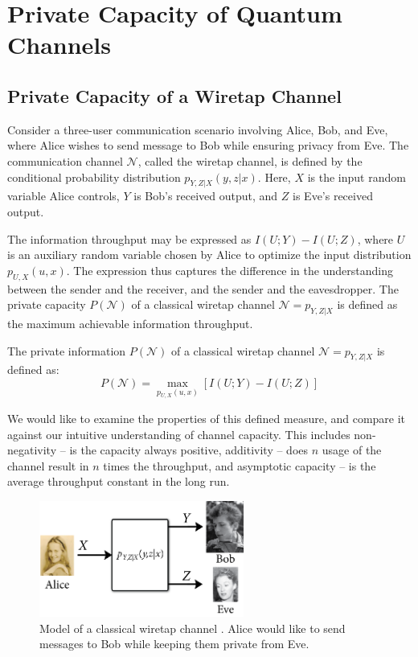 \section{Private Capacity of Quantum Channels}

\subsection{Private Capacity of a Wiretap Channel}

Consider a three-user communication scenario involving Alice, Bob, and Eve, where Alice wishes to send message to Bob while ensuring privacy from Eve. The communication channel $\mathcal{N}$, called the wiretap channel, is defined by the conditional probability distribution $p_{Y,Z|X}(y, z|x)$. Here, $X$ is the input random variable Alice controls, $Y$ is Bob's received output, and $Z$ is Eve's received output.

The information throughput may be expressed as $I(U; Y) - I(U; Z)$, where $U$ is an auxiliary random variable chosen by Alice to optimize the input distribution $p_{U,X}(u, x)$. The expression thus captures the difference in the understanding between the sender and the receiver, and the sender and the eavesdropper. The private capacity $P(\mathcal{N})$ of a classical wiretap channel $\mathcal{N} = p_{Y,Z|X}$ is defined as the maximum achievable information throughput.

\begin{definition}
The private information $P(\mathcal{N})$ of a classical wiretap channel $\mathcal{N} = p_{Y,Z|X}$ is defined as:
$$P(\mathcal{N}) = \max_{p_{U,X}(u,x)} \left[ I(U;Y) - I(U;Z) \right]$$
\end{definition}

We would like to examine the properties of this defined measure, and compare it against our intuitive understanding of channel capacity. This includes non-negativity -- is the capacity always positive, additivity -- does $n$ usage of the channel result in $n$ times the throughput, and asymptotic capacity -- is the average throughput constant in the long run.

\begin{figure}[H]
    \centering
    \includegraphics[width=0.6\textwidth]{figures/private_communication_wiretap_channel.png}
    \caption{Model of a classical wiretap channel \cite{Wilde_2016}. Alice would like to send messages to Bob while keeping them private from Eve.}
\end{figure}

